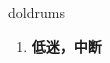 
\begin{frame}
{\huge doldrums}
\begin{center}
\begin{enumerate}\Large
  \item \textbf{低迷，中断}
\end{enumerate}
\end{center}
\end{frame}
